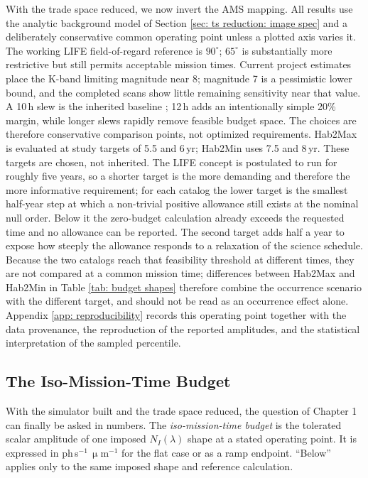 \documentclass[12pt,a4paper]{article}
\numberwithin{equation}{section}
\numberwithin{figure}{section}
\numberwithin{table}{section}
\begin{document}
With the trade space reduced, we now invert the AMS mapping. All results use the analytic background model of Section \ref{sec: ts reduction: image spec} and a deliberately conservative common operating point unless a plotted axis varies it. The working LIFE field-of-regard reference is $90^\circ$; $65^\circ$ is substantially more restrictive but still permits acceptable mission times. Current project estimates place the K-band limiting magnitude near 8; magnitude 7 is a pessimistic lower bound, and the completed scans show little remaining sensitivity near that value. A 10\,h slew is the inherited baseline \cite{dannert2025thesis}; 12\,h adds an intentionally simple 20\% margin, while longer slews rapidly remove feasible budget space. The choices are therefore conservative comparison points, not optimized requirements. Hab2Max is evaluated at study targets of 5.5 and 6\,yr; Hab2Min uses 7.5 and 8\,yr. These targets are chosen, not inherited. The LIFE concept is postulated to run for roughly five years, so a shorter target is the more demanding and therefore the more informative requirement; for each catalog the lower target is the smallest half-year step at which a non-trivial positive allowance still exists at the nominal null order. Below it the zero-budget calculation already exceeds the requested time and no allowance can be reported. The second target adds half a year to expose how steeply the allowance responds to a relaxation of the science schedule. Because the two catalogs reach that feasibility threshold at different times, they are not compared at a common mission time; differences between Hab2Max and Hab2Min in Table \ref{tab: budget shapes} therefore combine the occurrence scenario with the different target, and should not be read as an occurrence effect alone. Appendix \ref{app: reproducibility} records this operating point together with the data provenance, the reproduction of the reported amplitudes, and the statistical interpretation of the sampled percentile.

\subsection{The Iso-Mission-Time Budget}
With the simulator built and the trade space reduced, the question of Chapter 1 can finally be asked in numbers. The \textit{iso-mission-time budget} is the tolerated scalar amplitude of one imposed $N_I(\lambda)$ shape at a stated operating point. It is expressed in ph\,s$^{-1}$\,$\upmu$m$^{-1}$ for the flat case or as a ramp endpoint. ``Below'' applies only to the same imposed shape and reference calculation.
\end{document}
